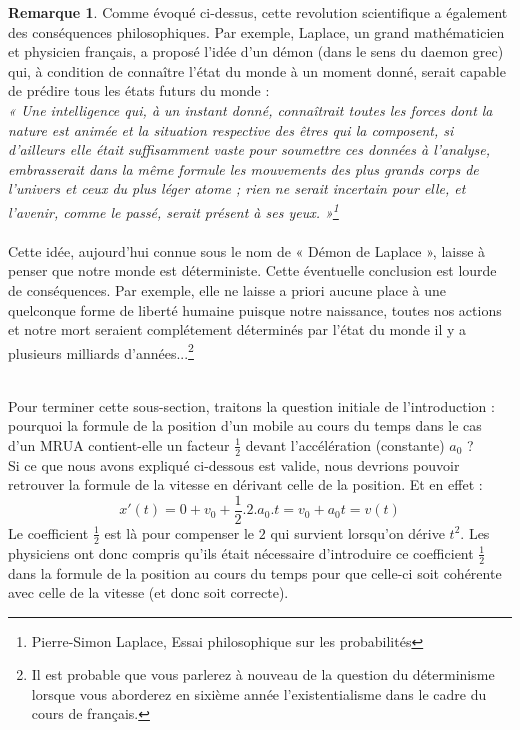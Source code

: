 \documentclass[a4paper,fontsize=13pt]{scrreprt}
\theoremstyle{plain}
\theoremstyle{definition}
\newtheorem{rema}[subsection]{Remarque}
\begin{document}
\begin{rema}
Comme évoqué ci-dessus, cette revolution scientifique a également des conséquences philosophiques. Par exemple, Laplace, un grand mathématicien et physicien français, a proposé l'idée d'un démon (dans le sens du daemon grec) qui, à condition de connaître l'état du monde à un moment donné, serait capable de prédire tous les états futurs du monde :\\
\textit{
« Une intelligence qui, à un instant donné, connaîtrait toutes les forces dont la nature est animée et la situation respective des êtres qui la composent, si d’ailleurs elle était suffisamment vaste pour soumettre ces données à l’analyse, embrasserait dans la même formule les mouvements des plus grands corps de l’univers et ceux du plus léger atome ; rien ne serait incertain pour elle, et l’avenir, comme le passé, serait présent à ses yeux. »\footnote{Pierre-Simon Laplace, Essai philosophique sur les probabilités}}\\
~~\\
Cette idée, aujourd'hui connue sous le nom de « Démon de Laplace », laisse à penser que notre monde est déterministe. Cette éventuelle conclusion est lourde de conséquences. Par exemple, elle ne laisse a priori aucune place à une quelconque forme de liberté humaine puisque notre naissance, toutes nos actions et notre mort seraient complétement déterminés par l'état du monde il y a plusieurs milliards d'années...\footnote{Il est probable que vous parlerez à nouveau de la question du déterminisme lorsque vous aborderez en sixième année l'existentialisme dans le cadre du cours de français.}
\end{rema}
~~\\
Pour terminer cette sous-section, traitons la question initiale de l'introduction : pourquoi la formule de la position d'un mobile au cours du temps dans le cas d'un MRUA contient-elle un facteur $\frac{1}{2}$ devant l'accélération (constante) $a_0$ ?\\
Si ce que nous avons expliqué ci-dessous est valide, nous devrions pouvoir retrouver la formule de la vitesse en dérivant celle de la position. Et en effet :
$$x'(t)=0+v_0 + \frac{1}{2}.2.a_0 .t = v_0 + a_0 t = v(t)$$
Le coefficient $\frac{1}{2}$ est là pour compenser le $2$ qui survient lorsqu'on dérive $t^2$. Les physiciens ont donc compris qu'ils était nécessaire d'introduire ce coefficient $\frac{1}{2}$ dans la formule de la position au cours du temps pour que celle-ci soit cohérente avec celle de la vitesse (et donc soit correcte).
\end{document}
